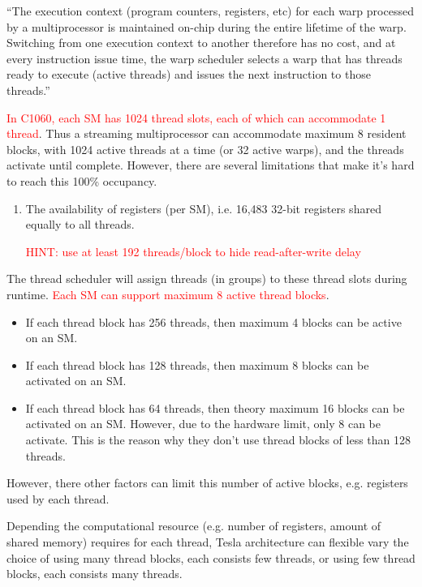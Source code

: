 \begin{framed}
  ``The execution context (program counters, registers, etc) for each
  warp processed by a multiprocessor is maintained on-chip during the
  entire lifetime of the warp. Switching from one execution context to
  another therefore has no cost, and at every instruction issue time,
  the warp scheduler selects a warp that has threads ready to execute
  (active threads) and issues the next instruction to those threads.''
\end{framed}
\textcolor{red}{In C1060, each SM has 1024 thread slots, each of which
  can accommodate 1 thread}.
Thus a streaming multiprocessor can accommodate maximum 8 resident
blocks, with 1024 active threads at a time (or 32 active warps), and
the threads activate until complete. However, there are several
limitations that make it's hard to reach this 100\% occupancy.
\begin{enumerate}
\item The availability of registers (per SM), i.e. 16,483 32-bit
  registers shared equally to all threads. 

  \textcolor{red}{HINT: use at least 192 threads/block to hide
    read-after-write delay}
\end{enumerate}

The thread scheduler will assign threads (in groups) to these thread
slots during runtime.
\textcolor{red}{Each SM can support maximum 8 active thread blocks}.
\begin{itemize}
\item If each thread block has 256 threads, then maximum 4 blocks can
  be active on an SM.
\item If each thread block has 128 threads, then maximum 8 blocks can
  be activated on an SM.
\item If each thread block has 64 threads, then theory maximum 16
  blocks can be activated on an SM. However, due to the hardware
  limit, only 8 can be activate. This is the reason why they don't use
  thread blocks of less than 128 threads. 
\end{itemize}
However, there other factors can limit this number of active blocks,
e.g. registers used by each thread. 

\begin{framed}
  Depending the computational resource (e.g. number of registers,
  amount of shared memory) requires for each thread, Tesla
  architecture can flexible vary the choice of using many thread
  blocks, each consists few threads, or using few thread blocks, each
  consists many threads.
\end{framed}

